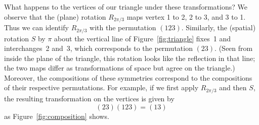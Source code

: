 \begin{example}
What happens to the vertices of our triangle under these transformations? We
observe that the (plane) rotation  $R_{2\pi/3}$  maps vertex  1  to  2,  2  to
3, and  3  to  1. Thus we can identify $R_{2\pi/3}$ with the permutation
$(123)$. Similarly, the (spatial) rotation $S$ by $\pi$ about the vertical line of
Figure~\ref{fig:triangle} fixes~1 and interchanges~2 and~3, which corresponds
to the permutation $(23)$. (Seen from inside the plane of the triangle, this
rotation looks like the reflection in that line; the two maps differ as
transformations of space but agree on the triangle.)
Moreover, the compositions of these symmetries correspond to the
compositions of their respective permutations. For example, if we first apply
$R_{2\pi/3}$  and then $S$, the resulting transformation on the vertices is
given by
\[
(23)(123)=(13)
\]
as Figure~\ref{fig:composition} shows. 

\begin{figure}
\end{figure}
\end{example}
